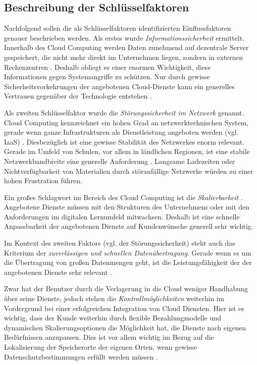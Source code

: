 \subsection{Beschreibung der Schlüsselfaktoren}

Nachfolgend sollen die als Schlüsselfaktoren identifizierten Einflussfaktoren genauer beschrieben werden. Als erstes wurde \textit{Informationssicherheit} ermittelt. Innerhalb des Cloud Computing werden Daten zunehmend auf dezentrale Server gespeichert, die nicht mehr direkt im Unternehmen liegen, sondern in externen Rechenzentren \cite{krcmar}. Deshalb obliegt es einer enormen Wichtigkeit, diese Informationen gegen Systemangriffe zu schützen. Nur durch gewisse Sicherheitsvorkehrungen der angebotenen Cloud-Dienste kann ein generelles Vertrauen gegenüber der Technologie entstehen \cite{gebauer}.

Als zweiten Schlüsselfaktor wurde die \textit{Störungssicherheit im Netzwerk} genannt. Cloud Computing kennzeichnet ein hohen Grad an netzwerktechnischen System, gerade wenn ganze Infrastrukturen als Dienstleistung angeboten werden (vgl. IaaS) \cite{krcmar}. Diesbezüglich ist eine gewisse Stabilität des Netzwerkes enorm relevant. Gerade im Umfeld von Schulen, vor allem in ländlichen Regionen, ist eine stabile Netzwerkbandbreite eine generelle Anforderung \cite{gebauer}. Langsame Ladezeiten oder Nichtverfügbarkeit von Materialien durch störanfällige Netzwerke würden zu einer hohen Frustration führen.

Ein großes Schlagwort im Bereich des Cloud Computing ist die \textit{Skalierbarkeit} \cite{renz}. Angebotene Dienste müssen mit den Strukturen des Unternehmens oder mit den Anforderungen im digitalen Lernumfeld mitwachsen. Deshalb ist eine schnelle Anpassbarkeit der angebotenen Dienste auf Kundenwünsche generell sehr wichtig.

Im Kontext des zweiten Faktors (vgl. der Störungssicherheit) steht auch das Kriterium der \textit{zuverlässigen und schnellen Datenübertragung}. Gerade wenn es um die Übertragung von großen Datenmengen geht, ist die Leistungsfähigkeit der der angebotenen Dienste sehr relevant \cite{gebauer}.

Zwar hat der Benutzer durch die Verlagerung in die Cloud weniger Handhabung über seine Dienste, jedoch stehen die \textit{Kontrollmöglichkeiten} weiterhin im Vordergrund bei einer erfolgreichen Integration von Cloud Diensten. Hier ist es wichtig, dass der Kunde weiterhin durch flexible Bezahlungmodelle und dynamischen Skalierungsoptionen die Möglichkeit hat, die Dienste nach eigenen Bedürfnissen anzupassen. Dies ist vor allem wichtig im Bezug auf die Lokalisierung der Speicherorte der eigenen Orten, wenn gewisse Datenschutzbestimmungen erfüllt werden müssen \cite{gebauer}.

